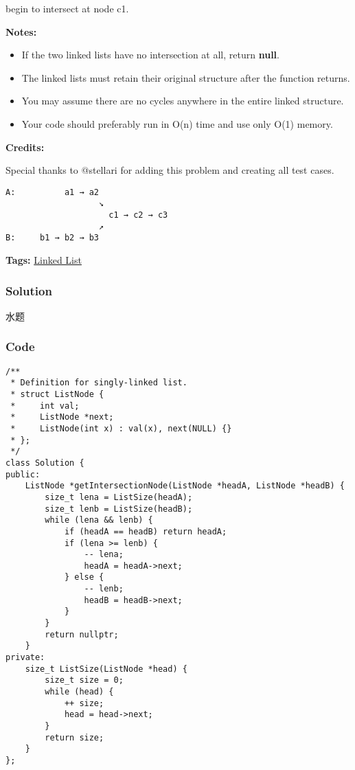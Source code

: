 \documentclass{article}
\begin{document}
\begin{CJK*}{UTF8}{gkai}
begin to intersect at node c1.

\textbf{Notes:}

\begin{itemize}
\item If the two linked lists have no intersection at all, return \textbf{null}.
\item The linked lists must retain their original structure after the function returns. 
\item You may assume there are no cycles anywhere in the entire linked structure.
\item Your code should preferably run in O(n) time and use only O(1) memory.
\end{itemize}

\textbf{Credits:}

Special thanks to @stellari for adding this problem and creating all test cases.

\begin{verbatim}
A:          a1 → a2
                   ↘
                     c1 → c2 → c3
                   ↗            
B:     b1 → b2 → b3
\end{verbatim}

\textbf{Tags: }
\hyperref[ Linked List ]{ Linked List }



\subsubsection*{Solution}
水题

\subsubsection*{Code}
\begin{lstlisting}
/**
 * Definition for singly-linked list.
 * struct ListNode {
 *     int val;
 *     ListNode *next;
 *     ListNode(int x) : val(x), next(NULL) {}
 * };
 */
class Solution {
public:
    ListNode *getIntersectionNode(ListNode *headA, ListNode *headB) {
        size_t lena = ListSize(headA);
        size_t lenb = ListSize(headB);
        while (lena && lenb) {
            if (headA == headB) return headA;
            if (lena >= lenb) {
                -- lena;
                headA = headA->next;
            } else {
                -- lenb;
                headB = headB->next;
            }
        }
        return nullptr;
    }
private:
    size_t ListSize(ListNode *head) {
        size_t size = 0;
        while (head) {
            ++ size;
            head = head->next;
        }
        return size;
    }
}; 
\end{lstlisting}



\end{CJK*}
\end{document}
